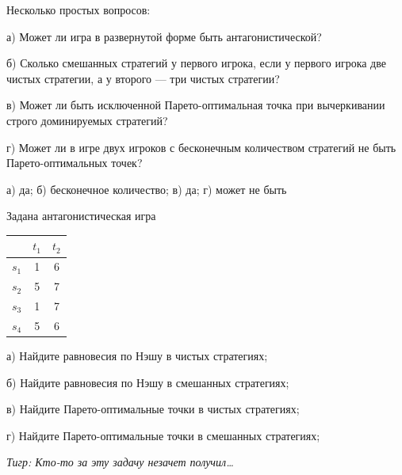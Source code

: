 \begin{problem}
 Несколько простых вопросов:\par
а) Может ли игра в развернутой форме быть антагонистической?\par
б) Сколько смешанных стратегий у первого игрока, если у первого игрока две чистых стратегии, а у второго — три чистых стратегии?\par
в) Может ли быть исключенной Парето-оптимальная точка при вычеркивании строго доминируемых стратегий?\par
г) Может ли в игре двух игроков с бесконечным количеством стратегий не быть Парето-оптимальных точек?



\begin{sol}
а) да; б) бесконечное количество; в) да; г) может не быть
\end{sol}
\end{problem}



\begin{problem}

Задана антагонистическая игра\par
\begin{tabular}{|c|c|c|}
\hline
& $t_{1}$ & $t_{2}$ \\
\hline
$s_{1}$ & 1 & 6 \\
$s_{2}$ & 5 & 7 \\
$s_{3}$ & 1 & 7 \\
$s_{4}$ & 5 & 6 \\
\hline
\end{tabular}

а)	Найдите равновесия по Нэшу в чистых стратегиях;\par
б)	Найдите равновесия по Нэшу в смешанных стратегиях;\par
в)	Найдите Парето-оптимальные точки в чистых стратегиях;\par
г)	Найдите Парето-оптимальные точки в смешанных стратегиях;\par
{\it Тигр: Кто-то за эту задачу незачет получил\ldots }



\begin{sol}

\end{sol}
\end{problem}



